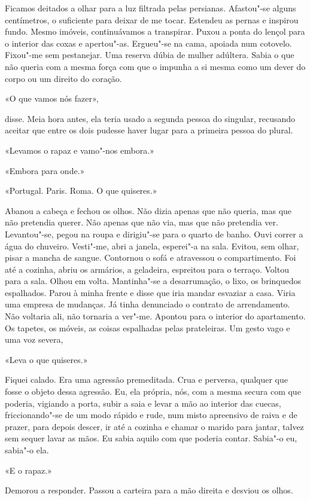 Ficamos deitados a olhar para a luz filtrada pelas persianas. Afastou"-se
alguns centímetros, o suficiente para deixar de me tocar. Estendeu as
pernas e inspirou fundo. Mesmo imóveis, continuávamos a transpirar.
Puxou a ponta do lençol para o interior das coxas e apertou"-as.
Ergueu"-se na cama, apoiada num cotovelo. Fixou"-me sem pestanejar. Uma
reserva dúbia de mulher adúltera. Sabia o que não queria com a mesma
força com que o impunha a si mesma como um dever do corpo ou um direito
do coração.

«O que vamos nós fazer»,

disse. Meia hora antes, ela teria usado a segunda pessoa do singular,
recusando aceitar que entre os dois pudesse haver lugar para a primeira
pessoa do plural.

«Levamos o rapaz e vamo"-nos embora.»

«Embora para onde.»

«Portugal. Paris. Roma. O que quiseres.»

Abanou a cabeça e fechou os olhos. Não dizia apenas que não queria, mas
que não pretendia querer. Não apenas que não via, mas que não pretendia
ver. Levantou"-se, pegou na roupa e dirigiu"-se para o quarto de banho.
Ouvi correr a água do chuveiro. Vesti"-me, abri a janela, esperei"-a na
sala. Evitou, sem olhar, pisar a mancha de sangue. Contornou o sofá e
atravessou o compartimento. Foi até a cozinha, abriu os armários, a
geladeira, espreitou para o terraço. Voltou para a sala. Olhou em
volta. Mantinha"-se a desarrumação, o lixo, os brinquedos espalhados.
Parou à minha frente e disse que iria mandar esvaziar a casa. Viria uma
empresa de mudanças. Já tinha denunciado o contrato de arrendamento. Não
voltaria ali, não tornaria a ver"-me. Apontou para o interior do
apartamento. Os tapetes, os móveis, as coisas espalhadas pelas
prateleiras. Um gesto vago e uma voz severa,

«Leva o que quiseres.»

Fiquei calado. Era uma agressão premeditada. Crua e perversa, qualquer
que fosse o objeto dessa agressão. Eu, ela própria, nós, com a mesma
secura com que poderia, vigiando a porta, subir a saia e levar a mão ao
interior das cuecas, friccionando"-se de um modo rápido e rude, num
misto apreensivo de raiva e de prazer, para depois descer, ir até a
cozinha e chamar o marido para jantar, talvez sem sequer lavar as mãos.
Eu sabia aquilo com que poderia contar. Sabia"-o eu, sabia"-o ela.

«E o rapaz.»

Demorou a responder. Passou a carteira para a mão direita e desviou os
olhos.

